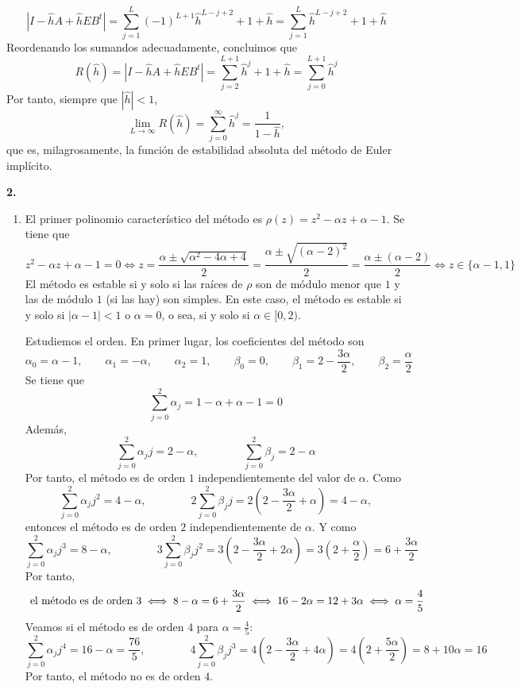 \documentclass[11pt]{report}
\begin{document}
\begin{enumerate}
    \[|I-\hat{h}A+\hat{h}EB^t| = \sum_{j=1}^{L}(-1)^{L+1}\hat{h}^{L-j+2}+1+\hat{h} = \sum_{j=1}^{L}\hat{h}^{L-j+2}+1+\hat{h}\]
    Reordenando los sumandos adecuadamente, concluimos que
    \[R(\hat{h}) = |I-\hat{h}A+\hat{h}EB^t| = \sum_{j=2}^{L+1}\hat{h}^j+1+\hat{h}=\sum_{j=0}^{L+1}\hat{h}^j\]
    Por tanto, siempre que $|\hat{h}|<1$,
    \[\lim_{L \to \infty} R(\hat{h}) = \sum_{j=0}^\infty \hat{h}^j = \frac{1}{1-\hat{h}},\]
    que es, milagrosamente, la función de estabilidad absoluta del método de Euler implícito.
\end{enumerate}

\textbf{2. }

\begin{enumerate}
    \item El primer polinomio característico del método es $\rho(z) = z^2-\alpha z+\alpha-1$. Se tiene que
    \[z^2-\alpha z+\alpha- 1 = 0 \iff z = \frac{\alpha\pm \sqrt{\alpha^2-4\alpha+4}}{2} = \frac{\alpha \pm \sqrt{(\alpha-2)^2}}{2} = \frac{\alpha \pm (\alpha-2)}{2} \iff z \in \{\alpha-1, 1\}\]
    El método es estable si y solo si las raíces de $\rho$ son de módulo menor que $1$ y las de módulo $1$ (si las hay) son simples. En este caso, el método es estable si y solo si $|\alpha-1|<1$ o $\alpha = 0$, o sea, si y solo si $\alpha \in [0,2)$.

    Estudiemos el orden. En primer lugar, los coeficientes del método son
    \[\alpha_0 = \alpha-1, \qquad \alpha_1=-\alpha, \qquad \alpha_2 = 1, \qquad \beta_0 = 0, \qquad \beta_1 = 2-\frac{3\alpha}{2}, \qquad \beta_2 = \frac{\alpha}{2}\]
    Se tiene que
    \[\sum_{j=0}^2 \alpha_j = 1-\alpha+\alpha-1 = 0\]
    Además,
    \[\sum_{j=0}^2 \alpha_j j =2-\alpha, \qquad \qquad  \sum_{j=0}^2 \beta_j = 2-\alpha\]
    Por tanto, el método es de orden $1$ independientemente del valor de $\alpha$. Como
    \[\sum_{j=0}^2 \alpha_j j^2 =4-\alpha, \qquad \qquad  2\sum_{j=0}^2 \beta_jj = 2\left(2-\frac{3\alpha}{2}+\alpha\right) = 4-\alpha,\]
    entonces el método es de orden $2$ independientemente de $\alpha$. Y como
    \[\sum_{j=0}^2 \alpha_j j^3 =8-\alpha, \qquad \qquad  3\sum_{j=0}^2 \beta_jj^2 = 3\left(2-\frac{3\alpha}{2}+2\alpha\right) =3 \left(2+\frac{\alpha}{2}\right) = 6+\frac{3\alpha}{2}\]
    Por tanto,
    \[\textup{ el método es de orden } 3 \iff 8-\alpha = 6+\frac{3\alpha}{2} \iff 16-2\alpha = 12+3\alpha \iff \alpha = \frac{4}{5}\]
    Veamos si el método es de orden $4$ para $\alpha = \frac{4}{5}$:
    \[\sum_{j=0}^2 \alpha_j j^4 =16-\alpha = \frac{76}{5}, \qquad \qquad 4\sum_{j=0}^2 \beta_jj^3 = 4\left(2-\frac{3\alpha}{2}+4\alpha\right) =4 \left(2+\frac{5\alpha}{2}\right) = 8+10\alpha = 16\]
    Por tanto, el método no es de orden $4$.


\end{enumerate}
\end{document}
